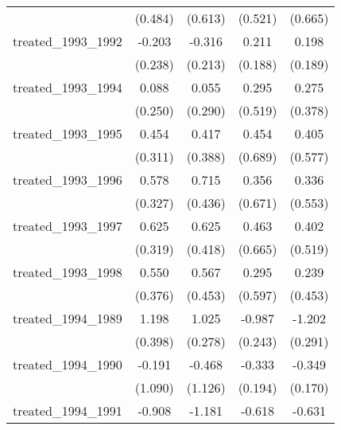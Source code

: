 {\begin{tabular}{l*{4}{c}}
            &     (0.484)         &     (0.613)         &     (0.521)         &     (0.665)         \\
[1em]
treated\_1993\_1992&      -0.203         &      -0.316         &       0.211         &       0.198         \\
            &     (0.238)         &     (0.213)         &     (0.188)         &     (0.189)         \\
[1em]
treated\_1993\_1994&       0.088         &       0.055         &       0.295         &       0.275         \\
            &     (0.250)         &     (0.290)         &     (0.519)         &     (0.378)         \\
[1em]
treated\_1993\_1995&       0.454         &       0.417         &       0.454         &       0.405         \\
            &     (0.311)         &     (0.388)         &     (0.689)         &     (0.577)         \\
[1em]
treated\_1993\_1996&       0.578         &       0.715         &       0.356         &       0.336         \\
            &     (0.327)         &     (0.436)         &     (0.671)         &     (0.553)         \\
[1em]
treated\_1993\_1997&       0.625         &       0.625         &       0.463         &       0.402         \\
            &     (0.319)         &     (0.418)         &     (0.665)         &     (0.519)         \\
[1em]
treated\_1993\_1998&       0.550         &       0.567         &       0.295         &       0.239         \\
            &     (0.376)         &     (0.453)         &     (0.597)         &     (0.453)         \\
[1em]
treated\_1994\_1989&       1.198\sym{**} &       1.025\sym{***}&      -0.987\sym{***}&      -1.202\sym{***}\\
            &     (0.398)         &     (0.278)         &     (0.243)         &     (0.291)         \\
[1em]
treated\_1994\_1990&      -0.191         &      -0.468         &      -0.333         &      -0.349\sym{*}  \\
            &     (1.090)         &     (1.126)         &     (0.194)         &     (0.170)         \\
[1em]
treated\_1994\_1991&      -0.908         &      -1.181         &      -0.618\sym{***}&      -0.631\sym{***}\\

\end{tabular}}
